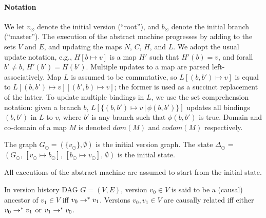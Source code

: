 \paragraph{Notation} We let $v_{\odot}$ denote the initial version
(``root''), and $b_{\odot}$ denote the initial branch (``master'').
The execution of the abstract machine progresses by adding to the sets
$V$ and $E$, and updating the maps $N$, $C$, $H$, and $L$. We adopt
the usual update notation, e.g., $H[b \mapsto v]$ is a map $H'$ such
that $H'(b) = v$, and forall $b' \neq b$, $H'(b') = H(b')$.  Multiple
updates to a map are parsed left-associatively. Map $L$ is assumed to
be commutative, so $L[(b,b') \mapsto v]$ is equal to $L[(b,b') \mapsto
v][(b',b) \mapsto v]$; the former is used as a succinct replacement of
the latter. To update multiple bindings in $L$, we use the set
comprehension notation: given a branch $b$, $L[\{(b,b') \mapsto v
\,|\, \phi(b,b')\}]$ updates all bindings $(b,b')$ in $L$ to $v$,
where $b'$ is any branch such that $\phi(b,b')$ is true. Domain and
co-domain of a map $M$ is denoted $dom(M)$ and $codom(M)$
respectively.

\begin{definition}
\label{def:init-state}
  The graph $G_{\odot} = (\{v_{\odot}\},\emptyset)$ is the initial
  version graph. The state $\Delta_{\odot}$ = $(G_{\odot},\,
  [v_{\odot} \mapsto b_{\odot}],\, [b_{\odot} \mapsto v_{\odot}],\,
  \emptyset)$ is the initial state.
\end{definition}

\noindent All executions of the abstract machine are assumed to start from the
initial state.

\begin{definition}[Ancestor]
  \label{def:ancestor}
  In version history DAG $G = (V,E)$, version $v_0 \in V$ is said
  to be a (causal) ancestor of $v_1 \in V$ iff $v_0 \rightarrow^{*} v_1$.
  Versions $v_0, v_1 \in V$ are causally related iff either $v_0
  \rightarrow^{*} v_1$ or $v_1 \rightarrow^{*} v_0$.
\end{definition}


